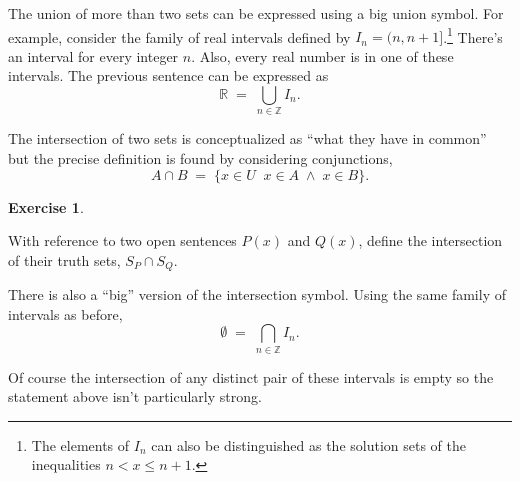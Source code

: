 \documentclass[10pt,]{book}
\theoremstyle{plain}
\theoremstyle{definition}
\theoremstyle{definition}
\newtheorem{exercise}[theorem]{Exercise}
\numberwithin{equation}{section}
\newcommand{\suchthat}{\;  \;}
\newcommand{\Integers}{{\mathbb Z}}
\newcommand{\Reals}{{\mathbb R}}
\newcommand{\lt}{ < }
\begin{document}
    The union of more than two sets can be expressed using a big union
    symbol. For example, consider the family of real intervals defined
    by \(I_n = (n,n+1]\).\footnote{The elements 
    of \(I_n\) can also be distinguished as the solution sets of 
    the inequalities \(n \lt  x \leq n+1\).\label{fn-27}}
    There's an interval for every integer \(n\). Also, every real number is in
    one of these intervals. The previous sentence can be expressed as
    \begin{equation*}
      \Reals \; = \; \bigcup_{n\in\Integers} I_n.
    \end{equation*}
\par

    The intersection of two sets is conceptualized as ``what they have in common''
    but the precise definition is found by considering conjunctions,
    \begin{equation*}
      A \cap B \; = \; \{ x \in U \suchthat x \in A \; \land \; x \in B \}.
    \end{equation*}
\begin{exercise}\label{exercise-36}

        With reference to two open sentences \(P(x)\) and \(Q(x)\), define the
        intersection of their truth sets, \(S_P \cap S_Q\).
\end{exercise}
\par

    There is also a ``big'' version of the intersection symbol. Using
    the same family of intervals as before,
    \begin{equation*}
      \mbox{\(\emptyset\)}  \; = \; \bigcap_{n\in\Integers} I_n.
    \end{equation*}
\par

    Of course the intersection of any distinct pair of these intervals is empty
    so the statement above isn't particularly strong.
\par
\end{document}
